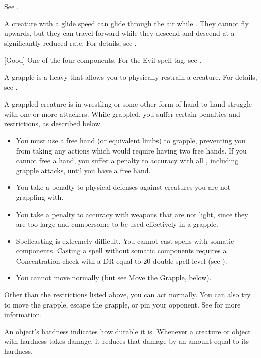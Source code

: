  See .

 A creature with a glide speed can glide through the air while .
They cannot fly upwards, but they can travel forward while they descend and descend at a significantly reduced rate.
For details, see .

[Good] One of the four  components. For the Evil spell tag, see .

 A grapple is a heavy  that allows you to physically restrain a creature.
For details, see .

 A grappled creature is in wrestling or some other form of hand-to-hand struggle with one or more attackers. While grappled, you suffer certain penalties and restrictions, as described below.

\begin{itemize}
    \item You must use a free hand (or equivalent limbs) to grapple, preventing you from taking any actions which would require having two free hands. If you cannot free a hand, you suffer a  penalty to accuracy with all , including grapple attacks, until you have a free hand.
    \item You take a  penalty to physical defenses against creatures you are not grappling with.
    \item You take a  penalty to accuracy with weapons that are not light, since they are too large and cumbersome to be used effectively in a grapple.
    \item Spellcasting is extremely difficult. You cannot cast spells with somatic components. Casting a spell without somatic components requires a Concentration check with a DR equal to 20 \add double spell level (see ).
    \item You cannot move normally (but see Move the Grapple, below).
\end{itemize}

Other than the restrictions listed above, you can act normally. You can also try to move the grapple, escape the grapple, or pin your opponent. See  for more information.

 An object's hardness indicates how durable it is.
Whenever a creature or object with hardness takes damage, it reduces that damage by an amount equal to its hardness.

